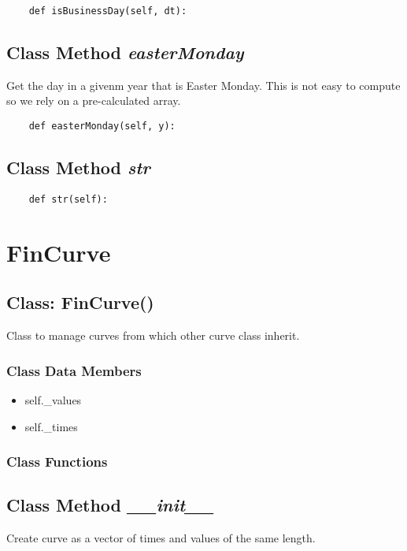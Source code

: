 \documentclass[twoside,11pt]{book}
\begin{document}
\begin{lstlisting}
    def isBusinessDay(self, dt):
\end{lstlisting}

\subsection{Class Method {\it easterMonday}}
Get the day in a givenm year that is Easter Monday. This is not easy to compute so we rely on a pre-calculated array. 

\begin{lstlisting}
    def easterMonday(self, y):
\end{lstlisting}

\subsection{Class Method {\it str}}


\begin{lstlisting}
    def str(self):
\end{lstlisting}

\newpage
\section{FinCurve}

\subsection{Class: FinCurve()}
Class to manage curves from which other curve class inherit. 

\subsubsection{Class Data Members}
\begin{itemize}
\item{self.\_values}
\item{self.\_times}
\end{itemize}

\subsubsection{Class Functions}

\subsection{Class Method {\it \_\_init\_\_}}
Create curve as a vector of times and values of the same length. 
\end{document}

